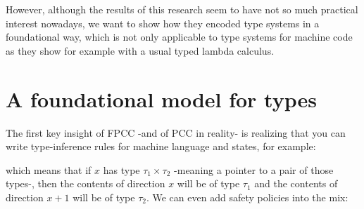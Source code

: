 \documentclass{article}
\begin{document}
However, although the results of this research seem to 
have not so much practical interest nowadays, we want to
show how they encoded type systems in a foundational way, 
which is not only applicable to type systems for machine 
code as they show for example with a usual typed lambda 
calculus.

\section*{A foundational model for types}

%    

The first key insight of FPCC -and of PCC in reality- 
is realizing that you can write type-inference rules
for machine language and states, for example:

\begin{prooftree}
\end{prooftree}

which means that if $x$ has type $\tau_1\times\tau_2$ 
-meaning a pointer to a pair of those types-, then 
the contents of direction $x$ will be of type $\tau_1$ 
and the contents of direction $x+1$ will be of type 
$\tau_2$. We can even add safety policies into the mix:

\begin{prooftree}
\end{prooftree}
\end{document}
